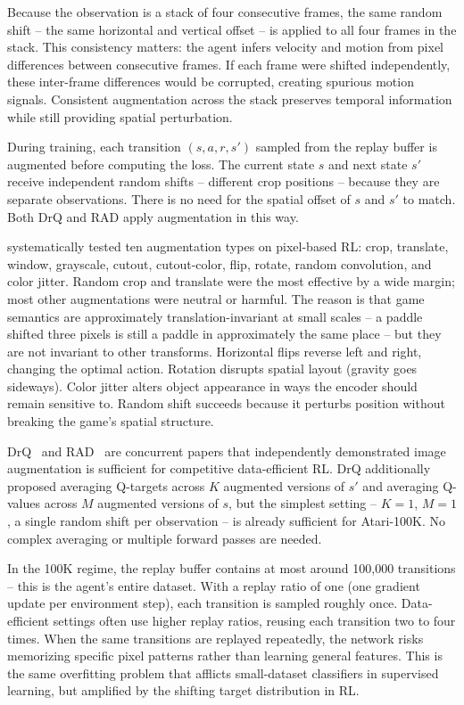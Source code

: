 

\smallskip
Because the observation is a stack of four consecutive frames, the
same random shift -- the same horizontal and vertical offset -- is
applied to all four frames in the stack. This consistency matters:
the agent infers velocity and motion from pixel differences between
consecutive frames. If each frame were shifted independently, these
inter-frame differences would be corrupted, creating spurious
motion signals. Consistent augmentation across the stack preserves
temporal information while still providing spatial perturbation.

\smallskip
During training, each transition $(s, a, r, s')$ sampled from the
replay buffer is augmented before computing the loss. The current
state $s$ and next state $s'$ receive independent random shifts --
different crop positions -- because they are separate observations.
There is no need for the spatial offset of $s$ and $s'$ to match.
Both DrQ and RAD apply augmentation in this way.

\smallskip
\citet{laskin2020reinforcement} systematically tested ten
augmentation types on pixel-based RL: crop, translate, window,
grayscale, cutout, cutout-color, flip, rotate, random convolution,
and color jitter. Random crop and translate were the most effective
by a wide margin; most other augmentations were neutral or harmful.
The reason is that game semantics are approximately
translation-invariant at small scales -- a paddle shifted three
pixels is still a paddle in approximately the same place -- but
they are not invariant to other transforms. Horizontal flips
reverse left and right, changing the optimal action. Rotation
disrupts spatial layout (gravity goes sideways). Color jitter
alters object appearance in ways the encoder should remain
sensitive to. Random shift succeeds because it perturbs position
without breaking the game's spatial structure.

\smallskip
DrQ~\citep{kostrikov2020image} and
RAD~\citep{laskin2020reinforcement} are concurrent papers that
independently demonstrated image augmentation is sufficient for
competitive data-efficient RL. DrQ additionally proposed averaging
Q-targets across $K$ augmented versions of $s'$ and averaging
Q-values across $M$ augmented versions of $s$, but the simplest
setting -- $K = 1$, $M = 1$, a single random shift per observation
-- is already sufficient for Atari-100K. No complex averaging or
multiple forward passes are needed.

\smallskip
In the 100K regime, the replay buffer contains at most around
100{,}000 transitions -- this is the agent's entire dataset. With a
replay ratio of one (one gradient update per environment step),
each transition is sampled roughly once. Data-efficient settings
often use higher replay ratios, reusing each transition two to four
times. When the same transitions are replayed repeatedly, the
network risks memorizing specific pixel patterns rather than
learning general features. This is the same overfitting problem
that afflicts small-dataset classifiers in supervised learning, but
amplified by the shifting target distribution in RL.

